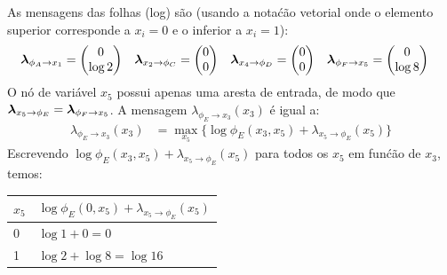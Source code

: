 \begin{exenumerate}
\begin{solution}
\begin{center}
        \end{center}
        As mensagens das folhas (log) s\~ao (usando a nota\'c\~ao vetorial onde o elemento superior corresponde a $x_i=0$ e o inferior a $x_i=1$):
        \begin{align}
            \boldsymbol{\lambda}_{\phi_A \to x_1} & = \begin{pmatrix}
                0\\
                \log 2
            \end{pmatrix}
            &
            \boldsymbol{\lambda}_{x_2 \to \phi_C} & = \begin{pmatrix}
                0\\
                0
            \end{pmatrix}
            &
            \boldsymbol{\lambda}_{x_4 \to \phi_D} &  = \begin{pmatrix}
                0\\
                0
            \end{pmatrix}
            &
            \boldsymbol{\lambda}_{\phi_F \to x_5} &  = \begin{pmatrix}
                0\\
                \log 8
            \end{pmatrix}
        \end{align}
        O n\'o de vari\'avel $x_5$ possui apenas uma aresta de entrada, de modo que
        $\boldsymbol{\lambda}_{x_5 \to \phi_E} = \boldsymbol{\lambda}_{\phi_F \to x_5}$. A
        mensagem $\lambda_{\phi_E \to x_3}(x_3)$ \'e igual a:
        \begin{align}
            \lambda_{\phi_E \to x_3}(x_3) & = \max_{x_5} \{ \log \phi_E(x_3, x_5) + \lambda_{x_5 \to \phi_E}(x_5) \}
        \end{align}
        Escrevendo $\log \phi_E(x_3, x_5) + \lambda_{x_5 \to \phi_E}(x_5)$ para todos os $x_5$ em fun\'c\~ao de $x_3$, temos:
        \begin{center}
            \begin{tabular}{ll}
                \toprule
                $x_5$ &  $\log \phi_E(0, x_5) + \lambda_{x_5 \to \phi_E}(x_5)$\\
                \midrule
                0  &  $\log 1 + 0 = 0$\\
                1  &  $\log 2 + \log 8 = \log 16$\\

\end{tabular}
\end{center}
\end{solution}
\end{exenumerate}
